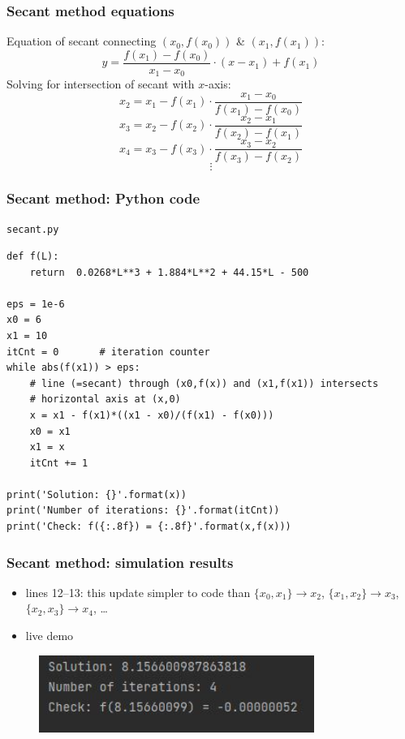 \documentclass[english,14pt]{beamer}
\begin{document}

\begin{frame}[fragile]

\frametitle{Secant method equations}
\vspace*{-2mm}
Equation of secant connecting $(x_0,f(x_0))$ \& $(x_1,f(x_1))$:
\[
	y = \frac{f(x_1)-f(x_0)}{x_1 - x_0}\cdot\left( x - x_1 \right) + f(x_1)
\]
Solving for intersection of secant with $x$-axis:
\[
	x_2 = x_1 - f(x_1)\cdot\frac{x_1 - x_0}{f(x_1) - f(x_0)}
\]
\pause
\[
	x_3 = x_2 - f(x_2)\cdot\frac{x_2 - x_1}{f(x_2) - f(x_1)}
\]
\[
	x_4 = x_3 - f(x_3)\cdot\frac{x_3 - x_2}{f(x_3) - f(x_2)}
\]
\[
	\vdots
\]

\end{frame}


\begin{frame}[fragile]

\frametitle{Secant method: Python code}

\texttt{secant.py}
\begin{lstlisting}[style=CStyle,basicstyle=\scriptsize]
def f(L):
    return  0.0268*L**3 + 1.884*L**2 + 44.15*L - 500

eps = 1e-6
x0 = 6
x1 = 10
itCnt = 0       # iteration counter
while abs(f(x1)) > eps:
    # line (=secant) through (x0,f(x)) and (x1,f(x1)) intersects
    # horizontal axis at (x,0)
    x = x1 - f(x1)*((x1 - x0)/(f(x1) - f(x0)))
    x0 = x1
    x1 = x
    itCnt += 1

print('Solution: {}'.format(x))
print('Number of iterations: {}'.format(itCnt))
print('Check: f({:.8f}) = {:.8f}'.format(x,f(x)))
\end{lstlisting}

\end{frame}


\begin{frame}[fragile]

\frametitle{Secant method: simulation results}

\begin{itemize}
	\item lines 12--13: this update simpler to code than $\{x_0, x_1\} \rightarrow x_2$, $\{x_1, x_2\} \rightarrow x_3$, $\{x_2, x_3\} \rightarrow x_4$, \ldots
	\item live demo
\end{itemize}

\begin{figure}[ht]
	\centering
	\includegraphics[width=0.8\textwidth]{figures/secantOutput}
\end{figure}

\end{frame}
\end{document}
